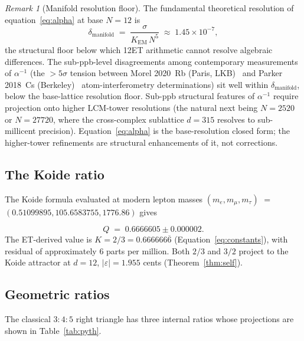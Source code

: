\documentclass[11pt,a4paper]{article}
\theoremstyle{definition}
\theoremstyle{remark}
\newtheorem{remark}[theorem]{Remark}
\newcommand{\eps}{\varepsilon}
\begin{document}
\begin{remark}[Manifold resolution floor]\label{rem:alpha-resolution-floor}
The fundamental theoretical resolution of equation~\eqref{eq:alpha} at base $N=12$ is
\[
\delta_{\mathrm{manifold}} \;=\; \frac{\sigma}{K_{\mathrm{EM}}\,N^{5}} \;\approx\; 1.45\times 10^{-7},
\]
the structural floor below which 12ET arithmetic cannot resolve algebraic differences. The sub-ppb-level disagreements among contemporary measurements of $\alpha^{-1}$ (the $>5\sigma$ tension between Morel 2020~Rb (Paris, LKB)~\cite{Morel2020} and Parker 2018~Cs (Berkeley)~\cite{Parker2018} atom-interferometry determinations) sit well within $\delta_{\mathrm{manifold}}$, below the base-lattice resolution floor. Sub-ppb structural features of $\alpha^{-1}$ require projection onto higher LCM-tower resolutions (the natural next being $N=2520$ or $N=27720$, where the cross-complex sublattice $d=315$ resolves to sub-millicent precision). Equation~\eqref{eq:alpha} is the base-resolution closed form; the higher-tower refinements are structural enhancements of it, not corrections.
\end{remark}

\subsection{The Koide ratio}\label{subsec:koide}

\begin{sloppypar}
The Koide formula evaluated at modern lepton masses $(m_{e},m_{\mu},m_{\tau})$\allowbreak{} $=$\allowbreak{} $(0.51099895, 105.6583755, 1776.86)$\allowbreak{} \cite{CODATA2022} gives
\end{sloppypar}
\[
Q \;=\; 0.6666605\pm 0.000002.
\]
The ET-derived value is $K = 2/3 = 0.666666\overline{6}$ (Equation~\ref{eq:constants}), with residual of approximately $6$ parts per million. Both $2/3$ and $3/2$ project to the Koide attractor at $d=12$, $|\eps|=1.955$ cents (Theorem~\ref{thm:self}).

\subsection{Geometric ratios}\label{subsec:geometry}

The classical $3{:}4{:}5$ right triangle has three internal ratios whose projections are shown in Table~\ref{tab:pyth}.
\end{document}
